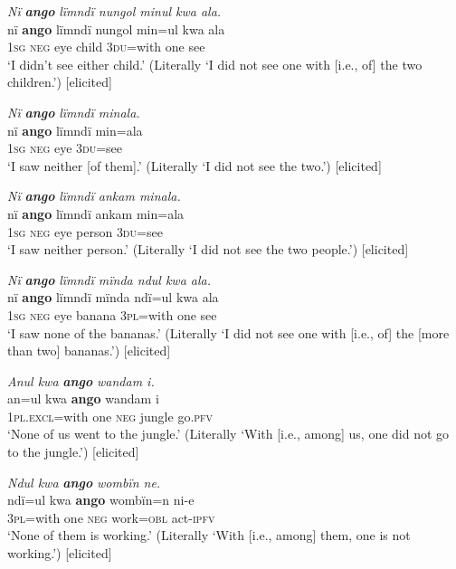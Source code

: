 \ea%
    \label{ex:syntax:125}
          \textit{Nï} \textbf{\textit{ango}} \textit{lïmndï nungol minul kwa ala.}\\
\gll    nï    \textbf{ango}  lïmndï  nungol  min=ul    kwa  ala\\
    \textsc{1sg}  \textsc{neg}  eye    child  \textsc{3du=}with  one    see\\
\glt `I didn’t see either child.’ (Literally ‘I did not see one with [i.e., of] the two children.’) [elicited]
\z

\ea%
    \label{ex:syntax:126}
          \textit{Nï} \textbf{\textit{ango}} \textit{lïmndï minala.}\\
\gll    nï    \textbf{ango}  lïmndï  min=ala\\
    \textsc{1sg}  \textsc{neg}  eye    \textsc{3du=}see\\
\glt `I saw neither [of them].’ (Literally ‘I did not see the two.’) [elicited]
\z

\ea%
    \label{ex:syntax:127}
          \textit{Nï} \textbf{\textit{ango}} \textit{lïmndï ankam minala.}\\
\gll    nï    \textbf{ango}  lïmndï  ankam  min=ala\\
    \textsc{1sg}  \textsc{neg}  eye    person  \textsc{3du=}see\\
\glt `I saw neither person.’ (Literally ‘I did not see the two people.’) [elicited]
\z

\ea%
    \label{ex:syntax:128}
          \textit{Nï} \textbf{\textit{ango}} \textit{lïmndï mïnda ndul kwa ala.}\\
\gll    nï    \textbf{ango}  lïmndï  mïnda  ndï=ul    kwa  ala\\
    \textsc{1sg}  \textsc{neg}  eye    banana  \textsc{3pl=}with  one    see\\
\glt `I saw none of the bananas.’ (Literally ‘I did not see one with [i.e., of] the [more than two] bananas.’) [elicited]
\z

\ea%
    \label{ex:syntax:129}
          \textit{Anul kwa} \textbf{\textit{ango}} \textit{wandam i.}\\
\gll    an=ul        kwa  \textbf{ango}  wandam  i\\
    \textsc{1pl.excl=}with  one    \textsc{neg}  jungle    go.\textsc{pfv}\\
\glt `None of us went to the jungle.’ (Literally ‘With [i.e., among] us, one did not go to the   jungle.’) [elicited]
\z

\ea%
    \label{ex:syntax:130}
          \textit{Ndul kwa} \textbf{\textit{ango}} \textit{wombïn ne.}\\
\gll    ndï=ul    kwa  \textbf{ango}  wombïn=n  ni-e\\
    \textsc{3pl=}with  one    \textsc{neg}  work=\textsc{obl}  act-\textsc{ipfv}\\
\glt `None of them is working.’ (Literally ‘With [i.e., among] them, one is not working.’) [elicited]
\z

